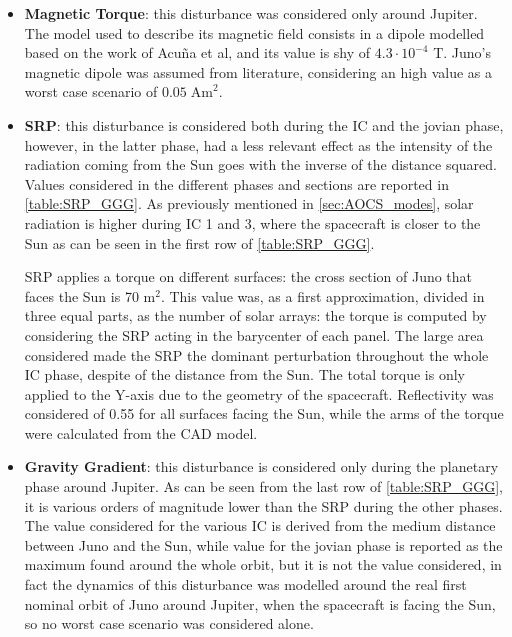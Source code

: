 \begin{itemize}
    \item \textbf{Magnetic Torque}: this disturbance was considered only around Jupiter. The model used to describe its magnetic field consists in a dipole modelled based on the work of Acuña et al\cite{jupiter_mag_field}, and its value is shy of $4.3\cdot 10^{-4}$ T. Juno's magnetic dipole was assumed from literature, considering an high value as a worst case scenario of $0.05 \; \textrm{Am}^2$.

    \item \textbf{SRP}: this disturbance is considered both during the IC and the jovian phase, however, in the latter phase, had a less relevant effect as the intensity of the radiation coming from the Sun goes with the inverse of the distance squared. Values considered in the different phases and sections are reported in \autoref{table:SRP_GGG}. As previously mentioned in \autoref{sec:AOCS_modes}, solar radiation is higher during IC 1 and 3, where the spacecraft is closer to the Sun as can be seen in the first row of \autoref{table:SRP_GGG}. 
    
    SRP applies a torque on different surfaces: the cross section of Juno that faces the Sun is 70 $\textrm{m}^2$. This value was, as a first approximation, divided in three equal parts, as the number of solar arrays: the torque is computed by considering the SRP acting in the barycenter of each panel. The large area considered made the SRP the dominant perturbation throughout the whole IC phase, despite of the distance from the Sun. The total torque is only applied to the Y-axis due to the geometry of the spacecraft. Reflectivity was considered of 0.55 for all surfaces facing the Sun, while the arms of the torque were calculated from the CAD model.

    \item \textbf{Gravity Gradient}: this disturbance is considered only during the planetary phase around Jupiter. As can be seen from the last row of \autoref{table:SRP_GGG}, it is various orders of magnitude lower than the SRP during the other phases. The value considered for the various IC is derived from the medium distance between Juno and the Sun, while value for the jovian phase is reported as the maximum found around the whole orbit, but it is not the value considered, in fact the dynamics of this disturbance was modelled around the real first nominal orbit of Juno around Jupiter, when the spacecraft is facing the Sun, so no worst case scenario was considered alone.   %
    

\end{itemize}
